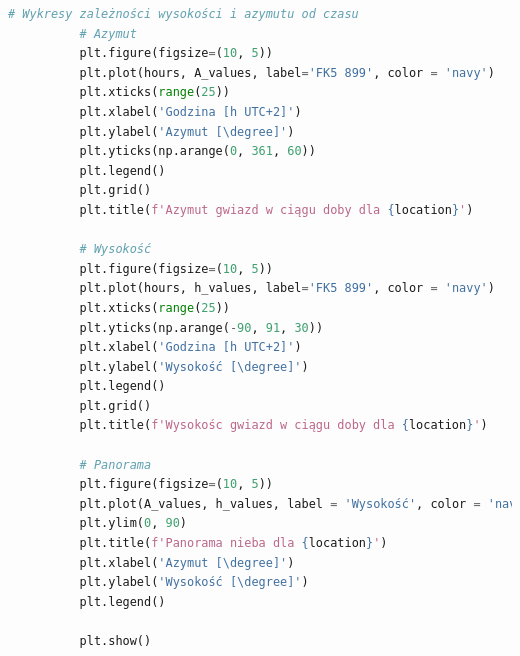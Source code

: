 \documentclass[fleqn,10pt,a4paper]{article}
\begin{document}
\begin{lstlisting}[language=Python, caption=Implementacja wykresów położenia gwiazdy FK5 899, label = kod3]
          # Wykresy zależności wysokości i azymutu od czasu
          # Azymut
          plt.figure(figsize=(10, 5))
          plt.plot(hours, A_values, label='FK5 899', color = 'navy')
          plt.xticks(range(25))
          plt.xlabel('Godzina [h UTC+2]')
          plt.ylabel('Azymut [\degree]')
          plt.yticks(np.arange(0, 361, 60))
          plt.legend()
          plt.grid()
          plt.title(f'Azymut gwiazd w ciągu doby dla {location}')
          
          # Wysokość
          plt.figure(figsize=(10, 5))
          plt.plot(hours, h_values, label='FK5 899', color = 'navy')
          plt.xticks(range(25))
          plt.yticks(np.arange(-90, 91, 30))
          plt.xlabel('Godzina [h UTC+2]')
          plt.ylabel('Wysokość [\degree]')
          plt.legend()
          plt.grid()
          plt.title(f'Wysokośc gwiazd w ciągu doby dla {location}')
          
          # Panorama
          plt.figure(figsize=(10, 5))
          plt.plot(A_values, h_values, label = 'Wysokość', color = 'navy')
          plt.ylim(0, 90)
          plt.title(f'Panorama nieba dla {location}')
          plt.xlabel('Azymut [\degree]')
          plt.ylabel('Wysokość [\degree]')
          plt.legend()
          
          plt.show()
\end{lstlisting}
\newpage
\end{document}
